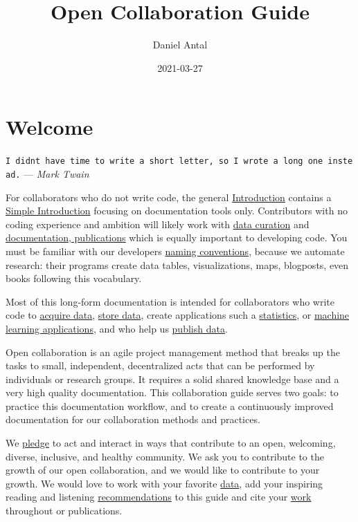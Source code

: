 \documentclass[
  fontsize=13pt,
  english,
  a4paper,
  openany, a4paper, oneside]{book}
\title{Open Collaboration Guide}
\author{Daniel Antal}
\date{2021-03-27}
\begin{document}
\maketitle

{
\hypersetup{linkcolor=}
\setcounter{tocdepth}{1}
\tableofcontents
}
\hypertarget{welcome}{%
\chapter*{Welcome}\label{welcome}}

\texttt{I\ didn\textquotesingle{}t\ have\ time\ to\ write\ a\ short\ letter,\ so\ I\ wrote\ a\ long\ one\ instead.} --- \emph{Mark Twain}

For collaborators who do not write code, the general \protect\hyperlink{intro}{Introduction} contains a \protect\hyperlink{simple-intro}{Simple Introduction} focusing on documentation tools only. Contributors with no coding experience and ambition will likely work with \protect\hyperlink{data-curation}{data curation} and \protect\hyperlink{documentation}{documentation, publications} which is equally important to developing code. You must be familiar with our developers \protect\hyperlink{naming-conventions}{naming conventions}, because we automate research: their programs create data tables, visualizations, maps, blogposts, even books following this vocabulary.

Most of this long-form documentation is intended for collaborators who write code to \protect\hyperlink{acquisition}{acquire data}, \protect\hyperlink{data-storage}{store data}, create applications such a \protect\hyperlink{statistical-software}{statistics}, or \protect\hyperlink{machine-learning}{machine learning applications}, and who help us \protect\hyperlink{data-release}{publish data}.

Open collaboration is an agile project management method that breaks up the tasks to small, independent, decentralized acts that can be performed by individuals or research groups. It requires a solid shared knowledge base and a very high quality documentation. This collaboration guide serves two goals: to practice this documentation workflow, and to create a continuously improved documentation for our collaboration methods and practices.

We \protect\hyperlink{pledge}{pledge} to act and interact in ways that contribute to an open, welcoming, diverse, inclusive, and healthy community. We ask you to contribute to the growth of our open collaboration, and we would like to contribute to your growth. We would love to work with your favorite \protect\hyperlink{data-curation}{data}, add your inspiring reading and listening \protect\hyperlink{inspiration}{recommendations} to this guide and cite your \protect\hyperlink{bibliography}{work} throughout or publications.
\end{document}
